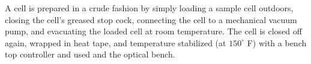A cell is prepared in a crude fashion by simply loading a sample cell outdoors, closing the cell's greased stop cock, connecting the cell to a mechanical vacuum pump, and evacuating the loaded cell at room temperature. The cell is closed off again, wrapped in heat tape, and temperature stabilized (at $150^\circ$ F) with a bench top controller and used and the optical bench.
